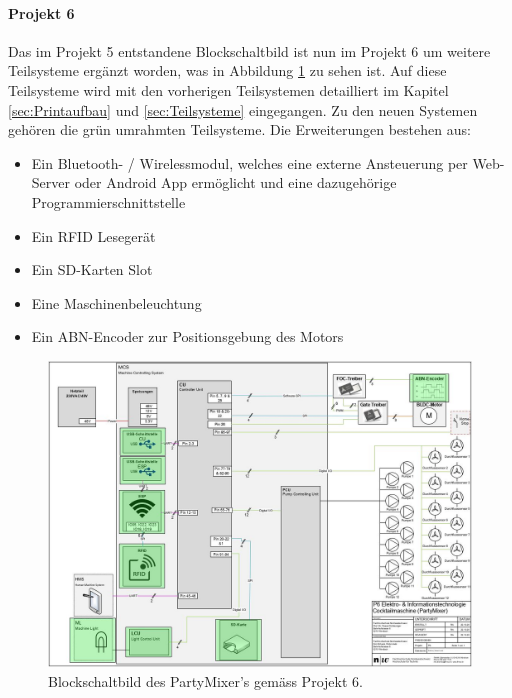 \paragraph{Projekt 6}\mbox{}

Das im Projekt 5 entstandene Blockschaltbild ist nun im Projekt 6 um weitere Teilsysteme ergänzt worden, was in Abbildung \ref{fig:Blockschaltbild_Partymixer} zu sehen ist. Auf diese Teilsysteme wird mit den vorherigen Teilsystemen detailliert im Kapitel \ref{sec:Printaufbau} und \ref{sec:Teilsysteme} eingegangen. Zu den neuen Systemen gehören die grün umrahmten Teilsysteme. Die Erweiterungen bestehen aus:

\begin{itemize}
\item Ein Bluetooth- / Wirelessmodul, welches eine externe Ansteuerung per Web-Server oder Android App ermöglicht und eine dazugehörige Programmierschnittstelle 
\item Ein RFID Lesegerät
\item Ein SD-Karten Slot
\item Eine Maschinenbeleuchtung 
\item Ein ABN-Encoder zur Positionsgebung des Motors
\end{itemize}
\mbox{}



\begin{figure}[h!]
\center
\includegraphics[angle=90, width = \textwidth]{graphics/Blockschaltbild}
\caption{Blockschaltbild des PartyMixer's gemäss Projekt 6.}
\label{fig:Blockschaltbild_Partymixer}
\end{figure}

\newpage

